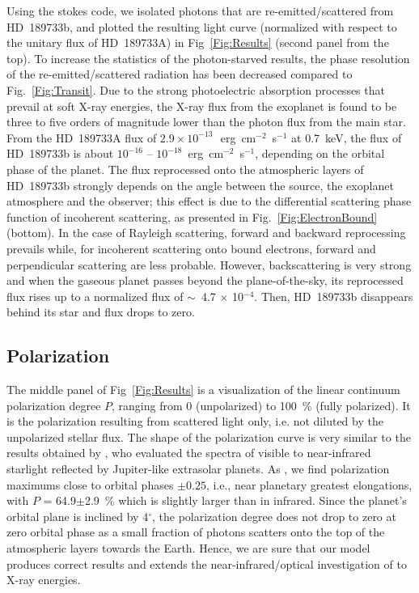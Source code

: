\documentclass[iop]{emulateapj}
\begin{document}
Using the {\sc stokes} code, we isolated photons that are re-emitted/scattered from HD~189733b, and plotted the resulting 
light curve (normalized with respect to the unitary flux of HD~189733A) in Fig~\ref{Fig:Results} (second panel from the top). 
To increase the statistics of the photon-starved results, the phase resolution of the re-emitted/scattered radiation
has been decreased compared to Fig.~\ref{Fig:Transit}. Due to the strong photoelectric absorption processes that prevail 
at soft X-ray energies, the X-ray flux from the exoplanet is found to be three to five orders of magnitude lower than the photon 
flux from the main star. From the HD~189733A flux of $2.9\times 10^{-13~}$~erg~cm$^{-2}$~s$^{-1}$ at 0.7~keV, the flux of HD~189733b 
is about $10^{-16}$ -- $10^{-18}$~erg~cm$^{-2}$~s$^{-1}$, depending on the orbital phase of the planet. The flux reprocessed onto the 
atmospheric layers of HD~189733b strongly depends on the angle between the source, the exoplanet atmosphere and the observer; this 
effect is due to the differential scattering phase function of incoherent scattering, as presented in Fig.~\ref{Fig:ElectronBound} 
(bottom). In the case of Rayleigh scattering, forward and backward reprocessing prevails while, for incoherent scattering onto bound 
electrons, forward and perpendicular scattering are less probable. However, backscattering is very strong and when the gaseous planet 
passes beyond the plane-of-the-sky, its reprocessed flux rises up to a normalized flux of $\sim$~4.7 $\times$ 10$^{-4}$.
Then, HD~189733b disappears behind its star and flux drops to zero. 


\subsection{Polarization}
\label{Results:polarization}

The middle panel of Fig~\ref{Fig:Results} is a visualization of the linear continuum polarization degree $P$, ranging from 0 
(unpolarized) to 100~\% (fully polarized). It is the polarization resulting from scattered light only, i.e. not diluted by the unpolarized 
stellar flux. The shape of the polarization curve is very similar to the results obtained by \citet{Stam2004}, who evaluated the spectra 
of visible to near-infrared starlight reflected by Jupiter-like extrasolar planets. As \citet{Stam2004}, we find polarization maximums 
close to orbital phases $\pm0.25$, i.e., near planetary greatest elongations, with $P$ = 64.9$\pm$2.9~\% which is slightly larger
than in infrared. Since the planet's orbital plane is inclined by 4$^{\circ}$, the polarization degree does not drop to zero at zero orbital 
phase as a small fraction of photons scatters onto the top of the atmospheric layers towards the Earth. Hence, we are sure that our model 
produces correct results and extends the near-infrared/optical investigation of \citet{Stam2004} to X-ray energies.
\end{document}
